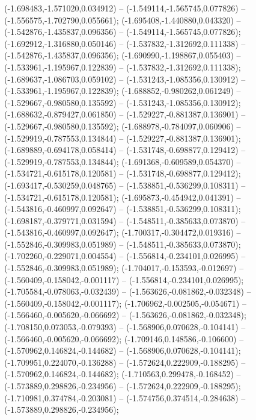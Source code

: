  (-1.698483,-1.571020,0.034912) -- (-1.549114,-1.565745,0.077826) -- (-1.556575,-1.702790,0.055661);
 (-1.695408,-1.440880,0.043320) -- (-1.542876,-1.435837,0.096356) -- (-1.549114,-1.565745,0.077826);
 (-1.692912,-1.316880,0.050146) -- (-1.537832,-1.312692,0.111338) -- (-1.542876,-1.435837,0.096356);
 (-1.690990,-1.198867,0.055403) -- (-1.533961,-1.195967,0.122839) -- (-1.537832,-1.312692,0.111338);
 (-1.689637,-1.086703,0.059102) -- (-1.531243,-1.085356,0.130912) -- (-1.533961,-1.195967,0.122839);
 (-1.688852,-0.980262,0.061249) -- (-1.529667,-0.980580,0.135592) -- (-1.531243,-1.085356,0.130912);
 (-1.688632,-0.879427,0.061850) -- (-1.529227,-0.881387,0.136901) -- (-1.529667,-0.980580,0.135592);
 (-1.688978,-0.784097,0.060906) -- (-1.529919,-0.787553,0.134844) -- (-1.529227,-0.881387,0.136901);
 (-1.689889,-0.694178,0.058414) -- (-1.531748,-0.698877,0.129412) -- (-1.529919,-0.787553,0.134844);
 (-1.691368,-0.609589,0.054370) -- (-1.534721,-0.615178,0.120581) -- (-1.531748,-0.698877,0.129412);
 (-1.693417,-0.530259,0.048765) -- (-1.538851,-0.536299,0.108311) -- (-1.534721,-0.615178,0.120581);
 (-1.695873,-0.454942,0.041391) -- (-1.543816,-0.460997,0.092647) -- (-1.538851,-0.536299,0.108311);
 (-1.698187,-0.379771,0.031594) -- (-1.548511,-0.385633,0.073870) -- (-1.543816,-0.460997,0.092647);
 (-1.700317,-0.304472,0.019316) -- (-1.552846,-0.309983,0.051989) -- (-1.548511,-0.385633,0.073870);
 (-1.702260,-0.229071,0.004554) -- (-1.556814,-0.234101,0.026995) -- (-1.552846,-0.309983,0.051989);
 (-1.704017,-0.153593,-0.012697) -- (-1.560409,-0.158042,-0.001117) -- (-1.556814,-0.234101,0.026995);
 (-1.705584,-0.078063,-0.032439) -- (-1.563626,-0.081862,-0.032348) -- (-1.560409,-0.158042,-0.001117);
 (-1.706962,-0.002505,-0.054671) -- (-1.566460,-0.005620,-0.066692) -- (-1.563626,-0.081862,-0.032348);
 (-1.708150,0.073053,-0.079393) -- (-1.568906,0.070628,-0.104141) -- (-1.566460,-0.005620,-0.066692);
 (-1.709146,0.148586,-0.106600) -- (-1.570962,0.146824,-0.144682) -- (-1.568906,0.070628,-0.104141);
 (-1.709951,0.224070,-0.136288) -- (-1.572624,0.222909,-0.188295) -- (-1.570962,0.146824,-0.144682);
 (-1.710563,0.299478,-0.168452) -- (-1.573889,0.298826,-0.234956) -- (-1.572624,0.222909,-0.188295);
 (-1.710981,0.374784,-0.203081) -- (-1.574756,0.374514,-0.284638) -- (-1.573889,0.298826,-0.234956);
